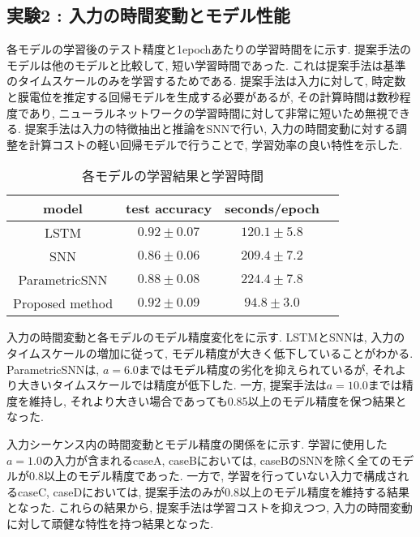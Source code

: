 \makeatletter %
\subsection{実験2 : 入力の時間変動とモデル性能}

各モデルの学習後のテスト精度と1epochあたりの学習時間をに示す.
提案手法のモデルは他のモデルと比較して, 短い学習時間であった.
これは提案手法は基準のタイムスケールのみを学習するためである.
提案手法は入力に対して, 時定数と膜電位を推定する回帰モデルを生成する必要があるが, その計算時間は数秒程度であり, ニューラルネットワークの学習時間に対して非常に短いため無視できる.
提案手法は入力の特徴抽出と推論をSNNで行い, 入力の時間変動に対する調整を計算コストの軽い回帰モデルで行うことで, 学習効率の良い特性を示した.
\begin{table}[htb]
    \centering
    \caption{各モデルの学習結果と学習時間}
    \label{sec4:tab:exp2}
    \begin{tabular}{cccc}
        \hline
        \textbf{model}&\textbf{test accuracy}&\textbf{seconds/epoch}\\
        \hline
        LSTM&$0.92\pm0.07$&$120.1\pm5.8$\\
        SNN&$0.86\pm0.06$&$209.4\pm7.2$\\
        ParametricSNN&$0.88\pm0.08$&$224.4\pm7.8$\\
        Proposed method&$0.92\pm0.09$&$94.8\pm3.0$\\
    \end{tabular}
\end{table}

入力の時間変動と各モデルのモデル精度変化をに示す.
LSTMとSNNは, 入力のタイムスケールの増加に従って, モデル精度が大きく低下していることがわかる.
ParametricSNNは, $a=6.0$まではモデル精度の劣化を抑えられているが, それより大きいタイムスケールでは精度が低下した.
一方, 提案手法は$a=10.0$までは精度を維持し, それより大きい場合であっても0.85以上のモデル精度を保つ結果となった.

入力シーケンス内の時間変動とモデル精度の関係をに示す.
学習に使用した$a=1.0$の入力が含まれるcaseA, caseBにおいては, caseBのSNNを除く全てのモデルが0.8以上のモデル精度であった.
一方で, 学習を行っていない入力で構成されるcaseC, caseDにおいては, 提案手法のみが0.8以上のモデル精度を維持する結果となった.
これらの結果から, 提案手法は学習コストを抑えつつ, 入力の時間変動に対して頑健な特性を持つ結果となった.